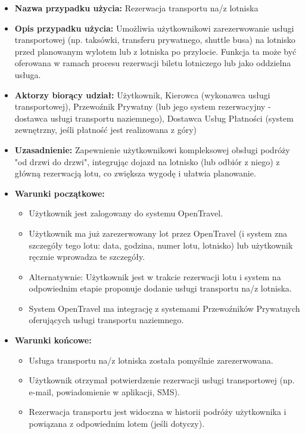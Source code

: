 \documentclass[a4paper,12pt]{article}
\begin{document}
\begin{itemize}
    \item \textbf{Nazwa przypadku użycia:} Rezerwacja transportu na/z lotniska
    \item \textbf{Opis przypadku użycia:} Umożliwia użytkownikowi zarezerwowanie usługi transportowej (np. taksówki, transferu prywatnego, shuttle busa) na lotnisko przed planowanym wylotem lub z lotniska po przylocie. Funkcja ta może być oferowana w ramach procesu rezerwacji biletu lotniczego lub jako oddzielna usługa.
    \item \textbf{Aktorzy biorący udział:} Użytkownik, Kierowca (wykonawca usługi transportowej), Przewoźnik Prywatny (lub jego system rezerwacyjny - dostawca usługi transportu naziemnego), Dostawca Usług Płatności (system zewnętrzny, jeśli płatność jest realizowana z góry)
    \item \textbf{Uzasadnienie:} Zapewnienie użytkownikowi kompleksowej obsługi podróży "od drzwi do drzwi", integrując dojazd na lotnisko (lub odbiór z niego) z główną rezerwacją lotu, co zwiększa wygodę i ułatwia planowanie.
    \item \textbf{Warunki początkowe:}
        \begin{itemize}
            \item Użytkownik jest zalogowany do systemu OpenTravel.
            \item Użytkownik ma już zarezerwowany lot przez OpenTravel (i system zna szczegóły tego lotu: data, godzina, numer lotu, lotnisko) lub użytkownik ręcznie wprowadza te szczegóły.
            \item Alternatywnie: Użytkownik jest w trakcie rezerwacji lotu i system na odpowiednim etapie proponuje dodanie usługi transportu na/z lotniska.
            \item System OpenTravel ma integrację z systemami Przewoźników Prywatnych oferujących usługi transportu naziemnego.
        \end{itemize}
    \item \textbf{Warunki końcowe:}
        \begin{itemize}
            \item Usługa transportu na/z lotniska została pomyślnie zarezerwowana.
            \item Użytkownik otrzymał potwierdzenie rezerwacji usługi transportowej (np. e-mail, powiadomienie w aplikacji, SMS).
            \item Rezerwacja transportu jest widoczna w historii podróży użytkownika i powiązana z odpowiednim lotem (jeśli dotyczy).

\end{itemize}
\end{itemize}
\end{document}
